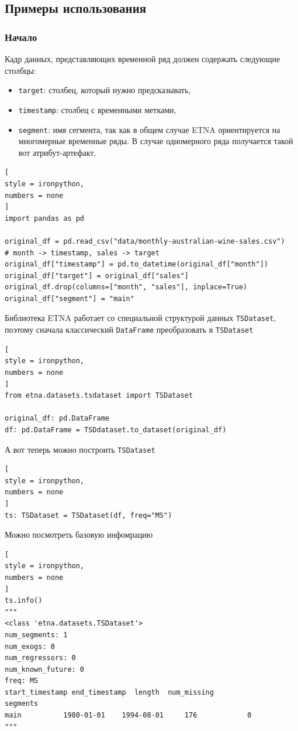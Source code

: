 \documentclass[%
	11pt,
	a4paper,
	utf8,
		]{article}
\begin{document}
\subsection{Примеры использования}

\subsubsection{Начало}

Кадр данных, представляющих временной ряд должен содержать следующие столбцы:
\begin{itemize}
	\item \verb|target|: столбец, который нужно предсказывать,
	
	\item \verb|timestamp|: столбец с временными метками,
	
	\item \verb|segment|: имя сегмента, так как в общем случае ETNA ориентируется на многомерные временные ряды. В случае одномерного ряда получается такой вот атрибут-артефакт.
\end{itemize}

\begin{lstlisting}[
style = ironpython,
numbers = none	
]
import pandas as pd

original_df = pd.read_csv("data/monthly-australian-wine-sales.csv")
# month -> timestamp, sales -> target
original_df["timestamp"] = pd.to_datetime(original_df["month"])
original_df["target"] = original_df["sales"]
original_df.drop(columns=["month", "sales"], inplace=True)
original_df["segment"] = "main"
\end{lstlisting}

Библиотека ETNA работает со специальной структурой данных \verb|TSDataset|, поэтому сначала классический \verb|DataFrame| преобразовать в \verb|TSDataset|
\begin{lstlisting}[
style = ironpython,
numbers = none
]
from etna.datasets.tsdataset import TSDataset

original_df: pd.DataFrame
df: pd.DataFrame = TSDdataset.to_dataset(original_df)
\end{lstlisting}

А вот теперь можно построить \verb|TSDataset|
\begin{lstlisting}[
style = ironpython,
numbers = none
]
ts: TSDataset = TSDataset(df, freq="MS")
\end{lstlisting}

Можно посмотреть базовую инфомрацию
\begin{lstlisting}[
style = ironpython,
numbers = none
]
ts.info()
"""
<class 'etna.datasets.TSDataset'>
num_segments: 1
num_exogs: 0
num_regressors: 0
num_known_future: 0
freq: MS
start_timestamp end_timestamp  length  num_missing
segments                                                   
main          1980-01-01    1994-08-01     176            0
"""
\end{lstlisting}
\end{document}
